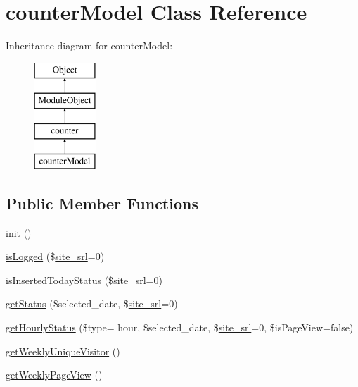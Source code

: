 \hypertarget{classcounterModel}{}\section{counter\+Model Class Reference}
\label{classcounterModel}
Inheritance diagram for counter\+Model\+:\begin{figure}[H]
\begin{center}
\leavevmode
\includegraphics[height=4.000000cm]{classcounterModel}
\end{center}
\end{figure}
\subsection*{Public Member Functions}
\begin{DoxyCompactItemize}
\item 
\hyperlink{classcounterModel_a3131ee0122d97e0b7d39d6d31a7227dc}{init} ()
\item 
\hyperlink{classcounterModel_a8d9351da08e33d6f47f8645d87ec9380}{is\+Logged} (\$\hyperlink{ko_8install_8php_a8b1406b4ad1048041558dce6bfe89004}{site\+\_\+srl}=0)
\item 
\hyperlink{classcounterModel_ad2e64d22eb37f58e91a37ebb1f421d35}{is\+Inserted\+Today\+Status} (\$\hyperlink{ko_8install_8php_a8b1406b4ad1048041558dce6bfe89004}{site\+\_\+srl}=0)
\item 
\hyperlink{classcounterModel_a83bc31a1c941d3972dba6eae69eab1f6}{get\+Status} (\$selected\+\_\+date, \$\hyperlink{ko_8install_8php_a8b1406b4ad1048041558dce6bfe89004}{site\+\_\+srl}=0)
\item 
\hyperlink{classcounterModel_a165e5f486e0b11e9f61f39ecf0f500eb}{get\+Hourly\+Status} (\$type= \textquotesingle{}hour\textquotesingle{}, \$selected\+\_\+date, \$\hyperlink{ko_8install_8php_a8b1406b4ad1048041558dce6bfe89004}{site\+\_\+srl}=0, \$is\+Page\+View=false)
\item 
\hyperlink{classcounterModel_ad43ae0f93cd42e9a59262abfe296fb9a}{get\+Weekly\+Unique\+Visitor} ()
\item 
\hyperlink{classcounterModel_a026465ce135cfff7827d869f1adaeb83}{get\+Weekly\+Page\+View} ()
\end{DoxyCompactItemize}
